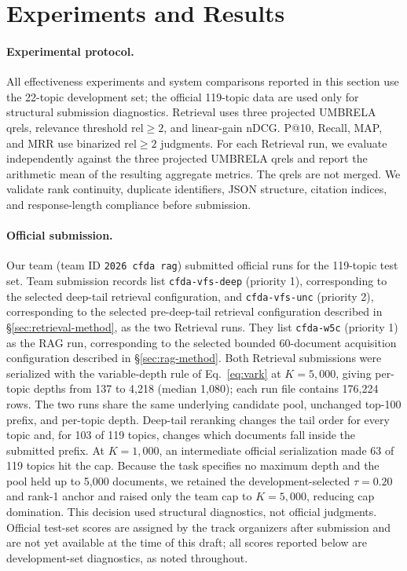 \section{Experiments and Results}

\paragraph{Experimental protocol.}

All effectiveness experiments and system comparisons reported in this
section use the 22-topic development set; the official 119-topic data
are used only for structural submission diagnostics. Retrieval uses
three projected UMBRELA qrels, relevance threshold
$\mathrm{rel}\geq2$, and linear-gain nDCG. P@10, Recall, MAP, and MRR
use binarized $\mathrm{rel}\geq2$ judgments. For each Retrieval run, we
evaluate independently against the three projected UMBRELA qrels and
report the arithmetic mean of the resulting aggregate metrics. The
qrels are not merged. We validate rank continuity, duplicate
identifiers, JSON structure, citation indices, and response-length
compliance before submission.

\paragraph{Official submission.}

Our team (team ID
\texttt{2026 cfda rag}) submitted official runs for the 119-topic test
set. Team submission records list \texttt{cfda-vfs-deep} (priority 1),
corresponding to the selected deep-tail retrieval configuration, and
\texttt{cfda-vfs-unc} (priority 2), corresponding
to the selected pre-deep-tail retrieval configuration described in
\S\ref{sec:retrieval-method}, as the two Retrieval runs. They list
\texttt{cfda-w5c} (priority 1) as the RAG run, corresponding to the
selected bounded 60-document acquisition configuration described in
\S\ref{sec:rag-method}.
Both Retrieval submissions were serialized with the
variable-depth rule of Eq.~\ref{eq:vark} at $K=5{,}000$, giving
per-topic depths from 137 to 4,218 (median 1,080); each run file
contains 176,224 rows.
The two runs share the same underlying candidate pool, unchanged
top-100 prefix, and per-topic depth. Deep-tail reranking changes the tail
order for every topic and, for 103 of 119 topics, changes which
documents fall inside the submitted prefix. At $K=1{,}000$, an
intermediate official serialization made 63 of 119 topics hit the cap.
Because the task specifies no maximum depth and the pool held up to
5,000 documents, we retained the development-selected $\tau=0.20$ and
rank-1 anchor and raised only the team cap to $K=5{,}000$, reducing cap
domination. This decision used structural diagnostics, not official
judgments. Official
test-set scores are assigned by the track
organizers after submission and are not yet available at the time of
this draft; all scores reported below are development-set diagnostics,
as noted throughout.

